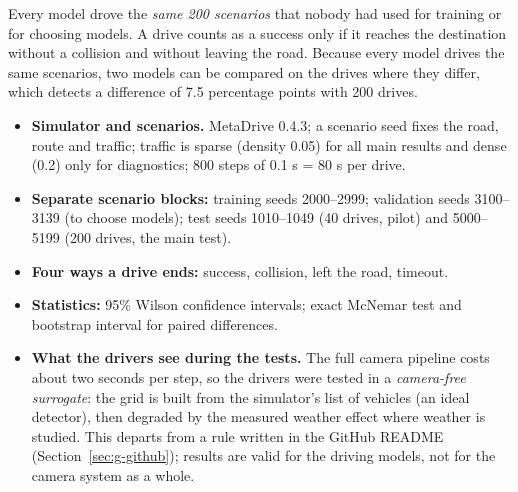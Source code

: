 \begin{plainwords}
Every model drove the \emph{same 200 scenarios} that nobody had used for training or for choosing models. A drive counts as a success only if it reaches the destination without a collision and without leaving the road. Because every model drives the same scenarios, two models can be compared on the drives where they differ, which detects a difference of 7.5 percentage points with 200 drives.
\end{plainwords}
\begin{itemize}
\item \textbf{Simulator and scenarios.} MetaDrive 0.4.3; a scenario seed fixes the road, route and traffic; traffic is sparse (density 0.05) for all main results and dense (0.2) only for diagnostics; 800 steps of 0.1 s = 80 s per drive.
\item \textbf{Separate scenario blocks:} training seeds 2000--2999; validation seeds 3100--3139 (to choose models); test seeds 1010--1049 (40 drives, pilot) and 5000--5199 (200 drives, the main test).
\item \textbf{Four ways a drive ends:} success, collision, left the road, timeout.
\item \textbf{Statistics:} 95\% Wilson confidence intervals; exact McNemar test and bootstrap interval for paired differences.
\item \textbf{What the drivers see during the tests.} The full camera pipeline costs about two seconds per step, so the drivers were tested in a \emph{camera-free surrogate}: the grid is built from the simulator's list of vehicles (an ideal detector), then degraded by the measured weather effect where weather is studied. This departs from a rule written in the GitHub README (Section~\ref{sec:g-github}); results are valid for the driving models, not for the camera system as a whole.
\end{itemize}
